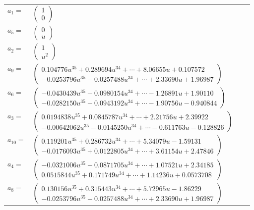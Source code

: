 \documentclass[1p]{elsarticle_modified}
\theoremstyle{definition}
\begin{document}
\begin{tabular}{m{7pt} m{180pt} m{7pt} m{180pt} }
\flushright $a_{1}=$&$\begin{pmatrix}1\\0\end{pmatrix}$ \\
\flushright $a_{5}=$&$\begin{pmatrix}0\\u\end{pmatrix}$ \\
\flushright $a_{2}=$&$\begin{pmatrix}1\\u^2\end{pmatrix}$ \\
\flushright $a_{9}=$&$\begin{pmatrix}0.104776 u^{35}+0.289694 u^{34}+\cdots+8.06655 u+0.107572\\-0.0253796 u^{35}-0.0257488 u^{34}+\cdots+2.33690 u+1.96987\end{pmatrix}$ \\
\flushright $a_{6}=$&$\begin{pmatrix}-0.0430439 u^{35}-0.0980154 u^{34}+\cdots-1.26891 u+1.90110\\-0.0282150 u^{35}-0.0943192 u^{34}+\cdots-1.90756 u-0.940844\end{pmatrix}$ \\
\flushright $a_{3}=$&$\begin{pmatrix}0.0194838 u^{35}+0.0845787 u^{34}+\cdots+2.21756 u+2.39922\\-0.00642062 u^{35}-0.0145250 u^{34}+\cdots-0.611763 u-0.128826\end{pmatrix}$ \\
\flushright $a_{10}=$&$\begin{pmatrix}0.119201 u^{35}+0.286732 u^{34}+\cdots+5.34079 u-1.59131\\-0.0176093 u^{35}+0.0122805 u^{34}+\cdots+3.61154 u+2.47846\end{pmatrix}$ \\
\flushright $a_{4}=$&$\begin{pmatrix}-0.0321006 u^{35}-0.0871705 u^{34}+\cdots+1.07521 u+2.34185\\0.0515844 u^{35}+0.171749 u^{34}+\cdots+1.14236 u+0.0573708\end{pmatrix}$ \\
\flushright $a_{8}=$&$\begin{pmatrix}0.130156 u^{35}+0.315443 u^{34}+\cdots+5.72965 u-1.86229\\-0.0253796 u^{35}-0.0257488 u^{34}+\cdots+2.33690 u+1.96987\end{pmatrix}$ \\

\end{tabular}
\end{document}
